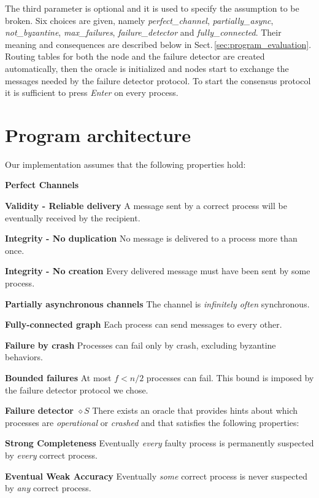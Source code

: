 \documentclass[a4paper]{article}
\begin{document}
The third parameter is optional and it is used to specify the assumption to be broken. Six choices are given, namely \emph{perfect\_channel}, \emph{partially\_async}, \emph{not\_byzantine}, \emph{max\_failures}, \emph{failure\_detector} and \emph{fully\_connected}. Their meaning and consequences are described below in Sect.\,\ref{sec:program_evaluation}.\newline
Routing tables for both the node and the failure detector are created automatically, then the oracle is initialized and nodes start to exchange the messages needed by the failure detector protocol. To start the consensus protocol it is sufficient to press \emph{Enter} on every process.


\section{Program architecture} %
\label{sec:program_architecture}

Our implementation assumes that the following properties hold:
\begin{compactitem}
  \item \textbf{Perfect Channels} \cite{models}
    \begin{compactitem}
      \item \textbf{Validity - Reliable delivery} A message sent by a correct process will be eventually received by the recipient.
      \item \textbf{Integrity - No duplication} No message is delivered to a process more than once.
      \item \textbf{Integrity - No creation} Every delivered message must have been sent by some process.
    \end{compactitem}
  \item \textbf{Partially asynchronous channels} The channel is \emph{infinitely often} synchronous.
  \item \textbf{Fully-connected graph} Each process can send messages to every other.
  \item \textbf{Failure by crash} Processes can fail only by crash, excluding byzantine behaviors.
  \item \textbf{Bounded failures} At most $f < n / 2$ processes can fail. This bound is imposed by the failure detector protocol we chose.
  \item \textbf{Failure detector $\diamond{}S$} There exists an oracle that provides hints about which processes are \emph{operational} or \emph{crashed} and that satisfies the following properties:
  \begin{compactitem}
    \item \textbf{Strong Completeness} Eventually \emph{every} faulty process is permanently suspected by \emph{every} correct process.
    \item \textbf{Eventual Weak Accuracy} Eventually \emph{some} correct process is never suspected by \emph{any} correct process.
  \end{compactitem}
\end{compactitem}
\end{document}
